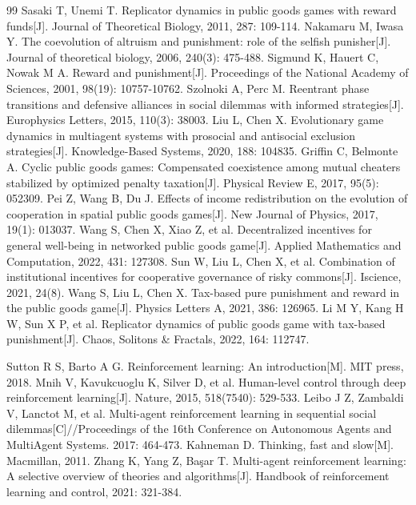 \documentclass[UTF8,a4paper,12pt]{ctexart}
\begin{document}
\begin{thebibliography}{99}
     Sasaki T, Unemi T. Replicator dynamics in public goods games with reward funds[J]. Journal of Theoretical Biology, 2011, 287: 109-114.
     Nakamaru M, Iwasa Y. The coevolution of altruism and punishment: role of the selfish punisher[J]. Journal of theoretical biology, 2006, 240(3): 475-488.
     Sigmund K, Hauert C, Nowak M A. Reward and punishment[J]. Proceedings of the National Academy of Sciences, 2001, 98(19): 10757-10762.
     Szolnoki A, Perc M. Reentrant phase transitions and defensive alliances in social dilemmas with informed strategies[J]. Europhysics Letters, 2015, 110(3): 38003.
     Liu L, Chen X. Evolutionary game dynamics in multiagent systems with prosocial and antisocial exclusion strategies[J]. Knowledge-Based Systems, 2020, 188: 104835.
     Griffin C, Belmonte A. Cyclic public goods games: Compensated coexistence among mutual cheaters stabilized by optimized penalty taxation[J]. Physical Review E, 2017, 95(5): 052309.
     Pei Z, Wang B, Du J. Effects of income redistribution on the evolution of cooperation in spatial public goods games[J]. New Journal of Physics, 2017, 19(1): 013037.
     Wang S, Chen X, Xiao Z, et al. Decentralized incentives for general well-being in networked public goods game[J]. Applied Mathematics and Computation, 2022, 431: 127308.
     Sun W, Liu L, Chen X, et al. Combination of institutional incentives for cooperative governance of risky commons[J]. Iscience, 2021, 24(8).
     Wang S, Liu L, Chen X. Tax-based pure punishment and reward in the public goods game[J]. Physics Letters A, 2021, 386: 126965.
     Li M Y, Kang H W, Sun X P, et al. Replicator dynamics of public goods game with tax-based punishment[J]. Chaos, Solitons \& Fractals, 2022, 164: 112747.
    
     Sutton R S, Barto A G. Reinforcement learning: An introduction[M]. MIT press, 2018.
     Mnih V, Kavukcuoglu K, Silver D, et al. Human-level control through deep reinforcement learning[J]. Nature, 2015, 518(7540): 529-533.
     Leibo J Z, Zambaldi V, Lanctot M, et al. Multi-agent reinforcement learning in sequential social dilemmas[C]//Proceedings of the 16th Conference on Autonomous Agents and MultiAgent Systems. 2017: 464-473.
     Kahneman D. Thinking, fast and slow[M]. Macmillan, 2011.
     Zhang K, Yang Z, Başar T. Multi-agent reinforcement learning: A selective overview of theories and algorithms[J]. Handbook of reinforcement learning and control, 2021: 321-384.
    

\end{thebibliography}
\end{document}
